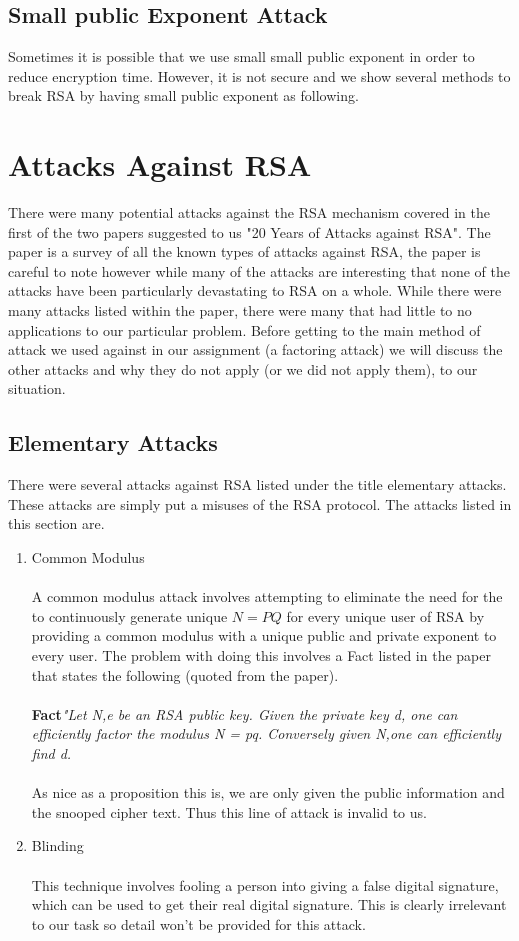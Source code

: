 \documentclass[12pt]{article} %
\begin{document}
\subsection{ Small public Exponent Attack}
		Sometimes it is possible that we use small small public exponent in order to reduce encryption time. However, it is not secure and we show several methods to break RSA by having small public exponent as following.

\section{Attacks Against RSA}
There were many potential attacks against the RSA mechanism covered in the first of the two papers suggested to us "20 Years of Attacks against RSA". The paper is a survey of all the known types of attacks against RSA, the paper is careful to note however while many of the attacks are interesting that none of the attacks have been particularly devastating to RSA on a whole. While there were many attacks listed within the paper, there were many that had little to no applications to our particular problem. Before getting to the main method of attack we used against in our assignment (a factoring attack) we will discuss the other attacks and why they do not apply (or we did not apply them), to our situation.
\subsection{Elementary Attacks}
There were several attacks against RSA listed under the title elementary attacks. These attacks are simply put a misuses of the RSA protocol. The attacks listed in this section are.
\begin{enumerate}
\item Common Modulus
\\\\
\indent A common modulus attack involves attempting to eliminate the need for the to continuously generate unique $ N = PQ $ for every unique user of RSA by providing a common modulus with a unique public and private exponent to every user. The problem with doing this involves a Fact listed in the paper that states the following (quoted from the paper).
\\\\
\textbf{Fact}\textit{"Let {N,e} be an RSA public key. Given the private key d, one can efficiently factor the modulus N = pq. Conversely given N,one can efficiently find d.}
\\\\
\indent As nice as a proposition this is, we are only given the public information and the snooped cipher text. Thus this line of attack is invalid to us.
\item Blinding
\\\\This technique involves fooling a person into giving a false digital signature, which can be used to get their real digital signature. This is clearly irrelevant to our task so detail won't be provided for this attack.
\end{enumerate}
\end{document}
